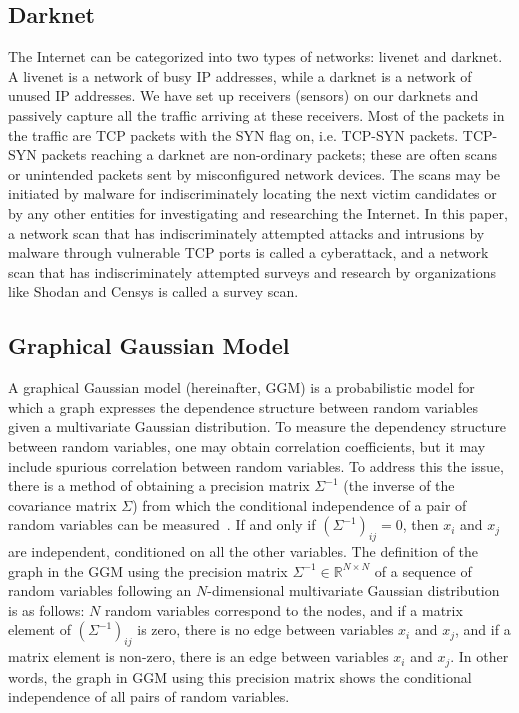 \documentclass[conference]{IEEEtran}
\begin{document}
\subsection{Darknet}
The Internet can be categorized into two types of networks: livenet and darknet.
A livenet is a network of busy IP addresses, while a darknet is a network of unused IP addresses.
We have set up receivers (sensors) on our darknets and passively capture all the traffic arriving at these receivers.
Most of the packets in the traffic are TCP packets with the SYN flag on, i.e. TCP-SYN packets.
TCP-SYN packets reaching a darknet are non-ordinary packets; these are often scans or unintended packets sent by misconfigured network devices.
The scans may be initiated by malware for indiscriminately locating the next victim candidates or by any other entities for investigating and researching the Internet.
In this paper, a network scan that has indiscriminately attempted attacks and intrusions by malware through vulnerable TCP ports is called a cyberattack, and a network scan that has indiscriminately attempted surveys and research by organizations like Shodan and Censys is called a survey scan.



\subsection{Graphical Gaussian Model}
A graphical Gaussian model (hereinafter, GGM) is a probabilistic model for which a graph expresses the dependence structure between random variables given a multivariate Gaussian distribution.
To measure the dependency structure between random variables, one may obtain correlation coefficients, but it may include spurious correlation between random variables.
To address this the issue, there is a method of obtaining a precision matrix $\Sigma^{-1}$ (the inverse of the covariance matrix $\Sigma$) from which the conditional independence of a pair of random variables can be measured~\cite{Ide}.
If and only if $(\Sigma^{-1})_{ij}=0$, then $x_ {i}$ and $x_ {j}$ are independent, conditioned on all the other variables.
The definition of the graph in the GGM using the precision matrix $\Sigma^{-1}\in\mathbb{R}^{N \times N}$ of a sequence of random variables following an $N$-dimensional multivariate Gaussian distribution is as follows: $N$ random variables correspond to the nodes, and if a matrix element of $(\Sigma^{-1})_{ij}$ is zero, there is no edge between variables $x_i$ and $x_j$, and if a matrix element is non-zero, there is an edge between variables $x_i$ and $x_j$.
In other words, the graph in GGM using this precision matrix shows the conditional independence of all pairs of random variables.
\end{document}
